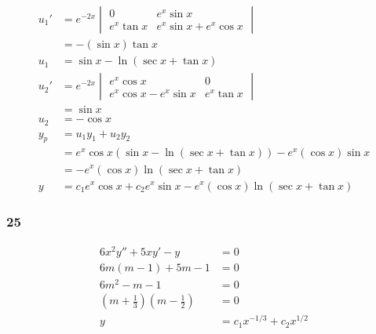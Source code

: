 \documentclass{article}
\begin{document}
\begin{align*}
  u_1' & = e^{-2 x} \begin{vmatrix}
                      0          & e^x \sin x              \\
                      e^x \tan x & e^x \sin x + e^x \cos x
                    \end{vmatrix}                        \\
       & = -(\sin x) \tan x                                                     \\
  u_1  & = \sin x - \ln (\sec x + \tan x)                                       \\
  u_2' & = e^{-2 x} \begin{vmatrix}
                      e^x \cos x              & 0          \\
                      e^x \cos x - e^x \sin x & e^x \tan x
                    \end{vmatrix}                        \\
       & = \sin x                                                               \\
  u_2  & = -\cos x                                                              \\
  y_p  & = u_1 y_1 + u_2 y_2                                                    \\
       & = e^x \cos x (\sin x - \ln (\sec x + \tan x)) - e^x (\cos x) \sin x    \\
       & = -e^x (\cos x) \ln (\sec x + \tan x)                                  \\
  y    & = c_1 e^x \cos x + c_2 e^x \sin x - e^x (\cos x) \ln (\sec x + \tan x)
\end{align*}

\subsubsection{25}

\begin{align*}
  6 x^2 y'' + 5 x y' - y                                        & = 0                              \\
  6 m (m - 1) + 5 m - 1                                         & = 0                              \\
  6 m^2 - m - 1                                                 & = 0                              \\
  \left( m + \frac{1}{3} \right) \left( m - \frac{1}{2} \right) & = 0                              \\
  y                                                             & = c_1 x^{-1 / 3} + c_2 x^{1 / 2}
\end{align*}
\end{document}
